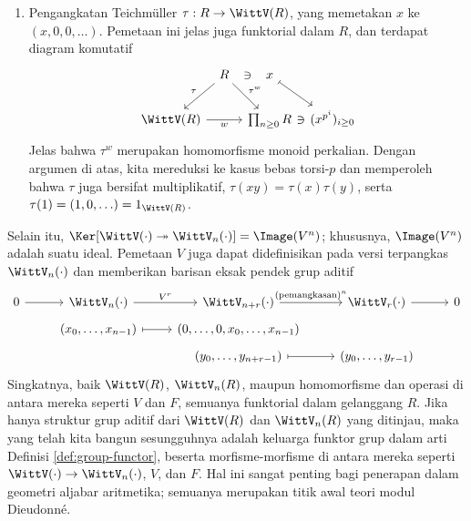 \begin{enumerate}
		Pembuktiannya sama dengan pembuktian Teorema \ref{prop:Witt-ring}. Pertama, tinjau unsur berkomponen peubah bebas $(X_i)_{i \geq 0} \in \WittV(\Z[X_0, \ldots])$, dan perhatikan bahwa gelanggang $\Z[X_0, \ldots]$ dilengkapi endomorfisme $\phi_p: X_i \mapsto X_i^p$ yang memenuhi $\phi_p(x) \equiv x^p \pmod p$. Terapkan Lema \ref{prop:Dwork-Witt} untuk menunjukkan bahwa $F^w(w(X_0, X_1, \ldots)) \in \Image(w)$; prapeta tunggalnya ditulis $(F_i(X_0, X_1, \ldots))_{i \geq 0} \in \WittV(\Z[X_0, \ldots])$. Ini mendefinisikan $F(x_0, x_1, \ldots) = (F_i(x_0, x_1, \ldots))_{i \geq 0}$ untuk setiap gelanggang $R$. Untuk membuktikan bahwa $F$ homomorfisme gelanggang, cukup perhatikan bahwa $F^w$ juga homomorfisme gelanggang, lalu ulangi teknik dalam pembuktian Teorema \ref{prop:Witt-ring}. Funktorialitas dibuktikan dengan cara yang sama.
	\item Pengangkatan Teichmüller $\tau: R \to \WittV(R)$, yang memetakan $x$ ke $(x,0,0, \ldots)$. Pemetaan ini jelas juga funktorial dalam $R$, dan terdapat diagram komutatif
		\[\begin{tikzcd}[column sep=tiny]
			& R \arrow[ld, "\tau"'] \arrow[rd, "\tau^w"] & x \arrow[phantom, l, "\ni" description] \arrow[mapsto, rd] & \\
			\WittV(R) \arrow[rr, "w"'] & & \prod_{n \geq 0} R & (x^{p^i})_{i \geq 0} \arrow[phantom, l, "\ni" description]
		\end{tikzcd}\]
		Jelas bahwa $\tau^w$ merupakan homomorfisme monoid perkalian. Dengan argumen di atas, kita mereduksi ke kasus bebas torsi-$p$ dan memperoleh bahwa $\tau$ juga bersifat multiplikatif, $\tau(xy)=\tau(x)\tau(y)$, serta $\tau(1) = (1,0, \ldots) = 1_{\WittV(R)}$.
\end{enumerate}

Selain itu, $\Ker[ \WittV(\cdot) \twoheadrightarrow \WittV_n(\cdot)] = \Image(V^n)$; khususnya, $\Image(V^n)$ adalah suatu ideal. Pemetaan $V$ juga dapat didefinisikan pada versi terpangkas $\WittV_n(\cdot)$ dan memberikan barisan eksak pendek grup aditif
\begin{equation}\label{eqn:Witt-V}\begin{tikzcd}[row sep=tiny]
	0 \arrow[r] & \WittV_n(\cdot) \arrow[r, "V^r"] & \WittV_{n+r}(\cdot) \arrow[r, "(\text{pemangkasan})^n"] & \WittV_r(\cdot) \arrow[r] & 0 \\
	& (x_0, \ldots, x_{n-1}) \arrow[mapsto, r] & (0, \ldots, 0, x_0, \ldots, x_{n-1}) & & \\
	& & (y_0, \ldots, y_{n+r-1}) \arrow[mapsto, r] & (y_0, \ldots, y_{r-1}) &
\end{tikzcd}\end{equation}
Singkatnya, baik $\WittV(R)$, $\WittV_n(R)$, maupun homomorfisme dan operasi di antara mereka seperti $V$ dan $F$, semuanya funktorial dalam gelanggang $R$. Jika hanya struktur grup aditif dari $\WittV(R)$ dan $\WittV_n(R)$ yang ditinjau, maka yang telah kita bangun sesungguhnya adalah keluarga funktor grup dalam arti Definisi \ref{def:group-functor}, beserta morfisme-morfisme di antara mereka seperti $\WittV(\cdot) \to \WittV_n(\cdot)$, $V$, dan $F$. Hal ini sangat penting bagi penerapan dalam geometri aljabar aritmetika; semuanya merupakan titik awal teori modul Dieudonné.

